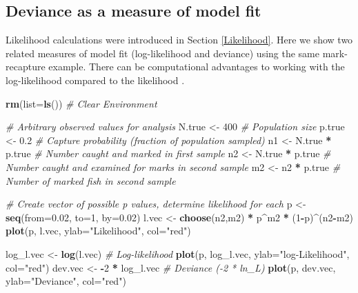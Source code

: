 \documentclass[
]{krantz}
\makeatletter
\newenvironment{Shaded}{\begin{snugshade}}{\end{snugshade}}
\newcommand{\AttributeTok}[1]{\textcolor[rgb]{0.27,0.27,0.27}{#1}}
\newcommand{\CommentTok}[1]{\textcolor[rgb]{0.37,0.37,0.37}{\textit{#1}}}
\newcommand{\DecValTok}[1]{\textcolor[rgb]{0.06,0.06,0.06}{#1}}
\newcommand{\FloatTok}[1]{\textcolor[rgb]{0.06,0.06,0.06}{#1}}
\newcommand{\FunctionTok}[1]{\textcolor[rgb]{0.27,0.27,0.27}{\textbf{#1}}}
\newcommand{\NormalTok}[1]{#1}
\newcommand{\OtherTok}[1]{\textcolor[rgb]{0.37,0.37,0.37}{#1}}
\newcommand{\SpecialCharTok}[1]{\textcolor[rgb]{0.43,0.43,0.43}{\textbf{#1}}}
\newcommand{\StringTok}[1]{\textcolor[rgb]{0.5,0.5,0.5}{#1}}
\newenvironment{kframe}{%
\medskip{}
\setlength{\fboxsep}{.8em}
 \def\at@end@of@kframe{}%
 \ifinner\ifhmode%
  \def\at@end@of@kframe{\end{minipage}}%
  \begin{minipage}{\columnwidth}%
 \fi\fi%
 \def\FrameCommand##1{\hskip\@totalleftmargin \hskip-\fboxsep
 \colorbox{shadecolor}{##1}\hskip-\fboxsep
     \hskip-\linewidth \hskip-\@totalleftmargin \hskip\columnwidth}%
 \MakeFramed {\advance\hsize-\width
   \@totalleftmargin\z@ \linewidth\hsize
   \@setminipage}}%
 {\par\unskip\endMakeFramed%
 \at@end@of@kframe}
\renewenvironment{Shaded}{\begin{kframe}}{\end{kframe}}
\makeatother
\begin{document}
\hypertarget{Deviance}{%
\subsection{Deviance as a measure of model fit}\label{Deviance}}

Likelihood calculations were introduced in Section \ref{Likelihood}. Here we show two related measures of model fit (log-likelihood and deviance) using the same mark-recapture example. There can be computational advantages to working with the log-likelihood compared to the likelihood \citep{mccarthy2007}.

\begin{Shaded}
\begin{Highlighting}[]
\FunctionTok{rm}\NormalTok{(}\AttributeTok{list=}\FunctionTok{ls}\NormalTok{()) }\CommentTok{\# Clear Environment}

\CommentTok{\# Arbitrary \textquotesingle{}observed\textquotesingle{} values for analysis}
\NormalTok{N.true }\OtherTok{\textless{}{-}} \DecValTok{400}  \CommentTok{\# Population size}
\NormalTok{p.true }\OtherTok{\textless{}{-}} \FloatTok{0.2} \CommentTok{\# Capture probability (fraction of population sampled)}
\NormalTok{n1 }\OtherTok{\textless{}{-}}\NormalTok{ N.true }\SpecialCharTok{*}\NormalTok{ p.true }\CommentTok{\# Number caught and marked in first sample}
\NormalTok{n2 }\OtherTok{\textless{}{-}}\NormalTok{ N.true }\SpecialCharTok{*}\NormalTok{ p.true }\CommentTok{\# Number caught and examined for marks in second sample}
\NormalTok{m2 }\OtherTok{\textless{}{-}}\NormalTok{ n2 }\SpecialCharTok{*}\NormalTok{ p.true }\CommentTok{\# Number of marked fish in second sample}

\CommentTok{\# Create vector of possible p values, determine likelihood for each}
\NormalTok{p }\OtherTok{\textless{}{-}} \FunctionTok{seq}\NormalTok{(}\AttributeTok{from=}\FloatTok{0.02}\NormalTok{, }\AttributeTok{to=}\DecValTok{1}\NormalTok{, }\AttributeTok{by=}\FloatTok{0.02}\NormalTok{)}
\NormalTok{l.vec }\OtherTok{\textless{}{-}} \FunctionTok{choose}\NormalTok{(n2,m2) }\SpecialCharTok{*}\NormalTok{ p}\SpecialCharTok{\^{}}\NormalTok{m2 }\SpecialCharTok{*}\NormalTok{ (}\DecValTok{1}\SpecialCharTok{{-}}\NormalTok{p)}\SpecialCharTok{\^{}}\NormalTok{(n2}\SpecialCharTok{{-}}\NormalTok{m2)}
\FunctionTok{plot}\NormalTok{(p, l.vec, }\AttributeTok{ylab=}\StringTok{"Likelihood"}\NormalTok{, }\AttributeTok{col=}\StringTok{"red"}\NormalTok{)}

\NormalTok{log\_l.vec }\OtherTok{\textless{}{-}} \FunctionTok{log}\NormalTok{(l.vec) }\CommentTok{\# Log{-}likelihood}
\FunctionTok{plot}\NormalTok{(p, log\_l.vec, }\AttributeTok{ylab=}\StringTok{"log{-}Likelihood"}\NormalTok{, }\AttributeTok{col=}\StringTok{"red"}\NormalTok{)}
\NormalTok{dev.vec }\OtherTok{\textless{}{-}} \SpecialCharTok{{-}}\DecValTok{2} \SpecialCharTok{*}\NormalTok{ log\_l.vec }\CommentTok{\# Deviance ({-}2 * ln\_L)}
\FunctionTok{plot}\NormalTok{(p, dev.vec, }\AttributeTok{ylab=}\StringTok{"Deviance"}\NormalTok{, }\AttributeTok{col=}\StringTok{"red"}\NormalTok{)}
\end{Highlighting}
\end{Shaded}
\end{document}
